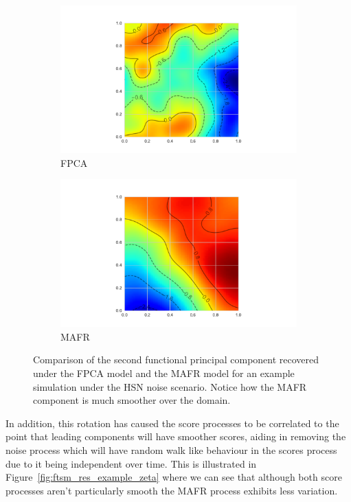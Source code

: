 \begin{figure}[!htbp]
	\centering
	\begin{subfigure}[b]{0.45\textwidth}
		\includegraphics[width=\textwidth]{ftsm_res_fpc_example_fpca}
		\caption{FPCA}
	\end{subfigure}             
	\begin{subfigure}[b]{0.45\textwidth}
		\includegraphics[width=\textwidth]{ftsm_res_fpc_example_mafr}
		\caption{MAFR}
	\end{subfigure}
	\caption[Comparison of the second functional principal component under FPCA and MAFR models.]{Comparison of the second functional principal component recovered under the FPCA model and the MAFR model for an example simulation under the HSN noise scenario. Notice how the MAFR component is much smoother over the domain.}
	\label{fig:ftsm_res_example_fpc}
\end{figure}

In addition, this rotation has caused the score processes to be correlated to the point that leading components will have smoother scores, aiding in removing the noise process which will have random walk like behaviour in the scores process due to it being independent over time.
This is illustrated in Figure~\ref{fig:ftsm_res_example_zeta} where we can see that although both score processes aren't particularly smooth the MAFR process exhibits less variation. 

